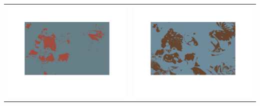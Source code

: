 \documentclass[fleqn]{article}
\begin{document}
\begin{center}
  \begin{longtable}{ c | c }
	\multicolumn{1}{c}{} & 
	\multicolumn{1}{c}{}  \\
	\includegraphics[scale=0.4]{./pics/task1and2/rio_k=2_random/K=2_iteration_1_random_2_rio.png} & \includegraphics[scale=0.4]{./pics/task1and2/rio_k=2_random/K=2_iteration_2_random_2_rio.png} \\\hline

\end{longtable}
\end{center}
\end{document}
